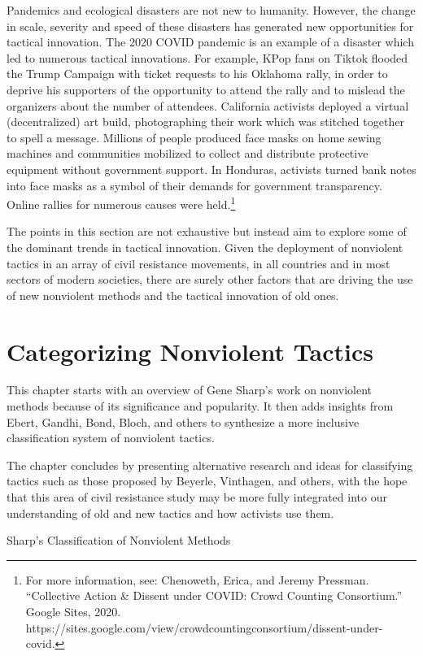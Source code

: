 \documentclass[twoside,a4paper,12pt,fleqn,openany]{extbook}
\begin{document}
Pandemics and ecological disasters are not new to humanity. However, the change in scale, severity and speed of these disasters has generated new opportunities for tactical innovation. The 2020 COVID pandemic is an example of a disaster which led to numerous tactical innovations. For example, KPop fans on Tiktok flooded the Trump Campaign with ticket requests to his Oklahoma rally, in order to deprive his supporters of the opportunity to attend the rally and to mislead the organizers about the number of attendees. California activists deployed a virtual (decentralized) art build, photographing their work which was stitched together to spell a message. Millions of people produced face masks on home sewing machines and communities mobilized to collect and distribute protective equipment without government support. In Honduras, activists turned bank notes into face masks as a symbol of their demands for government transparency. Online rallies for numerous causes were held.\footnote{For more information, see: Chenoweth, Erica, and Jeremy Pressman. “Collective Action & Dissent under COVID: Crowd Counting Consortium.” Google Sites, 2020. https://sites.google.com/view/crowdcountingconsortium/dissent-under-covid.}

The points in this section are not exhaustive but instead aim to explore some of the dominant trends in tactical innovation. Given the deployment of nonviolent tactics in an array of civil resistance movements, in all countries and in most sectors of modern societies, there are surely other factors that are driving the use of new nonviolent methods and the tactical innovation of old ones.

\chapter{Categorizing Nonviolent Tactics}

This chapter starts with an overview of Gene Sharp’s work on nonviolent methods because of its significance and popularity. It then adds insights from Ebert, Gandhi, Bond, Bloch, and others to synthesize a more inclusive classification system of nonviolent tactics.

The chapter concludes by presenting alternative research and ideas for classifying tactics such as those proposed by Beyerle, Vinthagen, and others, with the hope that this area of civil resistance study may be more fully integrated into our understanding of old and new tactics and how activists use them.

Sharp’s Classification of Nonviolent Methods
\end{document}
